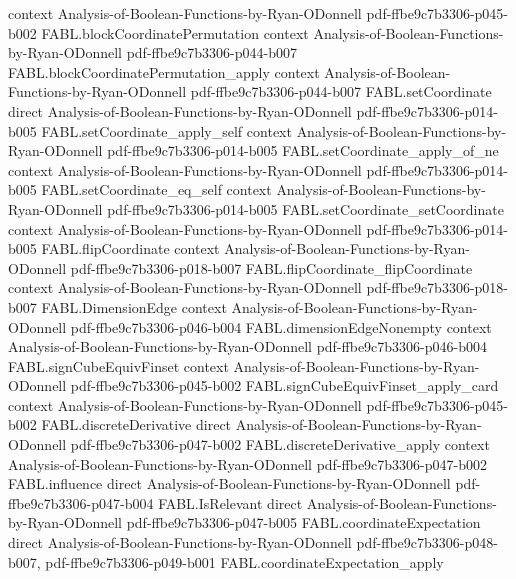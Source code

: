 \begin{theorem}
  {context}
  {Analysis-of-Boolean-Functions-by-Ryan-ODonnell}
  {pdf-ffbe9c7b3306-p045-b002}
\proofstep
  {FABL.blockCoordinatePermutation}
  {context}
  {Analysis-of-Boolean-Functions-by-Ryan-ODonnell}
  {pdf-ffbe9c7b3306-p044-b007}
\proofstep
  {FABL.blockCoordinatePermutation_apply}
  {context}
  {Analysis-of-Boolean-Functions-by-Ryan-ODonnell}
  {pdf-ffbe9c7b3306-p044-b007}
\proofstep
  {FABL.setCoordinate}
  {direct}
  {Analysis-of-Boolean-Functions-by-Ryan-ODonnell}
  {pdf-ffbe9c7b3306-p014-b005}
\proofstep
  {FABL.setCoordinate_apply_self}
  {context}
  {Analysis-of-Boolean-Functions-by-Ryan-ODonnell}
  {pdf-ffbe9c7b3306-p014-b005}
\proofstep
  {FABL.setCoordinate_apply_of_ne}
  {context}
  {Analysis-of-Boolean-Functions-by-Ryan-ODonnell}
  {pdf-ffbe9c7b3306-p014-b005}
\proofstep
  {FABL.setCoordinate_eq_self}
  {context}
  {Analysis-of-Boolean-Functions-by-Ryan-ODonnell}
  {pdf-ffbe9c7b3306-p014-b005}
\proofstep
  {FABL.setCoordinate_setCoordinate}
  {context}
  {Analysis-of-Boolean-Functions-by-Ryan-ODonnell}
  {pdf-ffbe9c7b3306-p014-b005}
\proofstep
  {FABL.flipCoordinate}
  {context}
  {Analysis-of-Boolean-Functions-by-Ryan-ODonnell}
  {pdf-ffbe9c7b3306-p018-b007}
\proofstep
  {FABL.flipCoordinate_flipCoordinate}
  {context}
  {Analysis-of-Boolean-Functions-by-Ryan-ODonnell}
  {pdf-ffbe9c7b3306-p018-b007}
\proofstep
  {FABL.DimensionEdge}
  {context}
  {Analysis-of-Boolean-Functions-by-Ryan-ODonnell}
  {pdf-ffbe9c7b3306-p046-b004}
\proofstep
  {FABL.dimensionEdgeNonempty}
  {context}
  {Analysis-of-Boolean-Functions-by-Ryan-ODonnell}
  {pdf-ffbe9c7b3306-p046-b004}
\proofstep
  {FABL.signCubeEquivFinset}
  {context}
  {Analysis-of-Boolean-Functions-by-Ryan-ODonnell}
  {pdf-ffbe9c7b3306-p045-b002}
\proofstep
  {FABL.signCubeEquivFinset_apply_card}
  {context}
  {Analysis-of-Boolean-Functions-by-Ryan-ODonnell}
  {pdf-ffbe9c7b3306-p045-b002}
\proofstep
  {FABL.discreteDerivative}
  {direct}
  {Analysis-of-Boolean-Functions-by-Ryan-ODonnell}
  {pdf-ffbe9c7b3306-p047-b002}
\proofstep
  {FABL.discreteDerivative_apply}
  {context}
  {Analysis-of-Boolean-Functions-by-Ryan-ODonnell}
  {pdf-ffbe9c7b3306-p047-b002}
\proofstep
  {FABL.influence}
  {direct}
  {Analysis-of-Boolean-Functions-by-Ryan-ODonnell}
  {pdf-ffbe9c7b3306-p047-b004}
\proofstep
  {FABL.IsRelevant}
  {direct}
  {Analysis-of-Boolean-Functions-by-Ryan-ODonnell}
  {pdf-ffbe9c7b3306-p047-b005}
\proofstep
  {FABL.coordinateExpectation}
  {direct}
  {Analysis-of-Boolean-Functions-by-Ryan-ODonnell}
  {pdf-ffbe9c7b3306-p048-b007,
    pdf-ffbe9c7b3306-p049-b001}
\proofstep
  {FABL.coordinateExpectation_apply}

\end{theorem}
